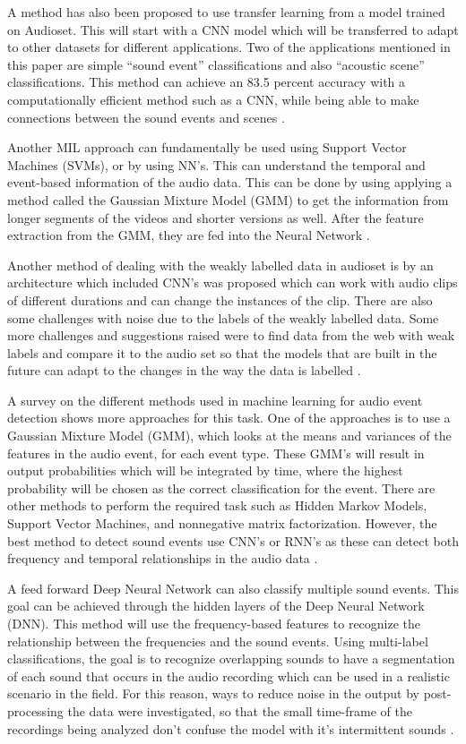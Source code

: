 \documentclass[journal]{IEEEtran}
\begin{document}
A method has also been proposed to use transfer learning from a model trained on Audioset. This will start with a CNN model which will be transferred to adapt to other datasets for different applications. Two of the applications mentioned in this paper are simple “sound event” classifications and also “acoustic scene” classifications. This method can achieve an 83.5 percent accuracy with a computationally efficient method such as a CNN, while being able to make connections between the sound events and scenes \cite{3}.

Another MIL approach can fundamentally be used using Support Vector Machines (SVMs), or by using NN’s. This can understand the temporal and event-based information of the audio data. This can be done by using applying a method called the Gaussian Mixture Model (GMM) to get the information from longer segments of the videos and shorter versions as well. After the feature extraction from the GMM, they are fed into the Neural Network \cite{4}.

Another method of dealing with the weakly labelled data in audioset is by an architecture which included CNN’s was proposed which can work with audio clips of different durations and can change the instances of the clip. There are also some challenges with noise due to the labels of the weakly labelled data. Some more challenges and suggestions raised were to find data from the web with weak labels and compare it to the audio set so that the models that are built in the future can adapt to the changes in the way the data is labelled \cite{5}.


A survey on the different methods used in machine learning for audio event detection shows more approaches for this task. One of the approaches is to use a Gaussian Mixture Model (GMM), which looks at the means and variances of the features in the audio event, for each event type. These GMM’s will result in output probabilities which will be integrated by time, where the highest probability will be chosen as the correct classification for the event. There are other methods to perform the required task such as Hidden Markov Models, Support Vector Machines, and nonnegative matrix factorization. However, the best method to detect sound events use CNN’s or RNN’s as these can detect both frequency and temporal relationships in the audio data \cite{6}.

A feed forward Deep Neural Network can also classify multiple sound events. This goal can be achieved through the hidden layers of the Deep Neural Network (DNN). This method will use the frequency-based features to recognize the relationship between the frequencies and the sound events. Using multi-label classifications, the goal is to recognize overlapping sounds to have a segmentation of each sound that occurs in the audio recording which can be used in a realistic scenario in the field. For this reason, ways to reduce noise in the output by post-processing the data were investigated, so that the small time-frame of the recordings being analyzed don’t confuse the model with it’s intermittent sounds \cite{7}. 
\end{document}
